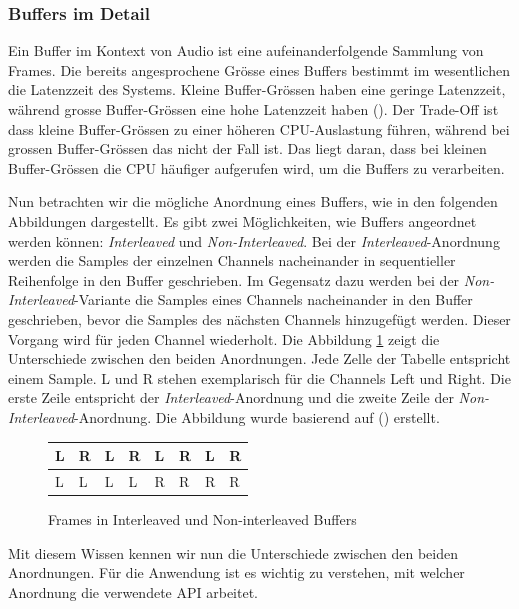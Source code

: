 \documentclass[11pt,a4paper]{article}
\begin{document}
\subsubsection{Buffers im Detail}
Ein Buffer im Kontext von Audio ist eine aufeinanderfolgende Sammlung von Frames. Die bereits
angesprochene Grösse eines Buffers bestimmt im wesentlichen die Latenzzeit des Systems. Kleine
Buffer-Grössen haben eine geringe Latenzzeit, während grosse Buffer-Grössen eine hohe Latenzzeit 
haben (\cite[p.10]{somberg2019audioapi}). Der Trade-Off ist dass kleine Buffer-Grössen 
zu einer höheren CPU-Auslastung führen, während bei grossen Buffer-Grössen das nicht der Fall ist.
Das liegt daran, dass bei kleinen Buffer-Grössen die CPU häufiger aufgerufen wird, um die Buffers
zu verarbeiten. 

\noindent
\newline
Nun betrachten wir die mögliche Anordnung eines Buffers, wie in den folgenden Abbildungen 
dargestellt. Es gibt zwei Möglichkeiten, wie Buffers angeordnet werden 
können: \textit{Interleaved} und \textit{Non-Interleaved}. Bei der \textit{Interleaved}-Anordnung 
werden die Samples der einzelnen Channels nacheinander in sequentieller Reihenfolge in den Buffer 
geschrieben. Im Gegensatz dazu werden bei der \textit{Non-Interleaved}-Variante die Samples 
eines Channels nacheinander in den Buffer geschrieben, bevor die Samples des nächsten Channels 
hinzugefügt werden. Dieser Vorgang wird für jeden Channel wiederholt. Die Abbildung 
\ref{fig:frames_buffers} zeigt die Unterschiede zwischen den beiden Anordnungen. Jede Zelle der 
Tabelle entspricht einem Sample. L und R stehen exemplarisch für die Channels Left und Right.
Die erste Zeile entspricht der \textit{Interleaved}-Anordnung und die zweite Zeile der
\textit{Non-Interleaved}-Anordnung. Die Abbildung wurde basierend auf 
(\cite[p.11]{somberg2019audioapi}) erstellt.


\begin{figure}[h]
    \centering
    \begin{tabularx}{\textwidth}{|X|X|X|X|X|X|X|X|}
    \hline
    L & R & L & R & L & R & L & R \\
    \hline
    L & L & L & L & R & R & R & R \\
    \hline
    \end{tabularx}
    \caption{Frames in Interleaved und Non-interleaved Buffers}
    \label{fig:frames_buffers}
\end{figure}

\noindent
Mit diesem Wissen kennen wir nun die Unterschiede zwischen den beiden Anordnungen. Für die 
Anwendung ist es wichtig zu verstehen, mit welcher Anordnung die verwendete API arbeitet.
\end{document}
